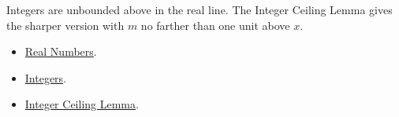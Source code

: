 \begin{remark*}[Interpretation]
Integers are unbounded above in the real line. The Integer Ceiling Lemma gives
the sharper version with $m$ no farther than one unit above $x$.
\end{remark*}

\begin{dependencies}
\begin{itemize}
\item \hyperref[def:reals]{Real Numbers}.
\item \hyperref[def:integers]{Integers}.
\item \hyperref[lem:integer-ceiling-lemma]{Integer Ceiling Lemma}.
\end{itemize}
\end{dependencies}



